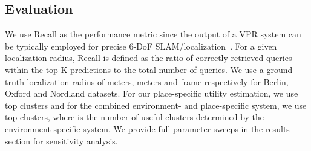 \documentclass[letterpaper, 10 pt, conference]{ieeeconf}  \fi
\begin{document}
\subsection{Evaluation}
\label{sec:Metric}
We use Recall as the performance metric since the output of a VPR system can be typically employed for precise 6-DoF SLAM/localization~\cite{zaffar2021vpr}. For a given localization radius, Recall is defined as the ratio of correctly retrieved queries within the top K predictions to the total number of queries. We use a ground truth localization radius of  meters,  meters and  frame respectively for Berlin, Oxford and Nordland datasets. For our place-specific utility estimation, we use top  clusters and for the combined environment- and place-specific system, we use top  clusters, where  is the number of useful clusters determined by the environment-specific system. We provide full parameter sweeps in the results section for sensitivity analysis.
\end{document}
